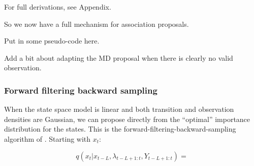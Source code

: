 For full derivations, see Appendix.

So we now have a full mechanism for association proposals.

Put in some pseudo-code here.

Add a bit about adapting the MD proposal when there is clearly no valid observation.


\subsubsection{Forward filtering backward sampling}

When the state space model is linear and both transition and observation densities are Gaussian, we can propose directly from the ``optimal'' importance distribution for the states. This is the forward-filtering-backward-sampling algorithm of \cite{Chib1999}. Starting with $x_t$:

\begin{equation}
q(x_t|x_{t-L}, \lambda_{t-L+1:t}, Y_{t-L+1:t}) = 
\label{eq:}
\end{equation}